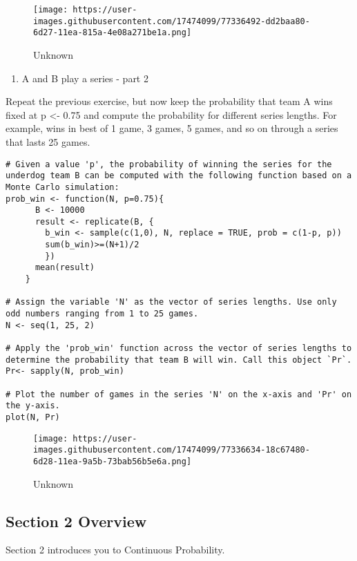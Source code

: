 \documentclass[
]{article}
\providecommand{\tightlist}{%
  \setlength{\itemsep}{0pt}\setlength{\parskip}{0pt}}
\begin{document}
\begin{figure}
\centering
\texttt{[image: https://user-images.githubusercontent.com/17474099/77336492-dd2baa80-6d27-11ea-815a-4e08a271be1a.png]}
\caption{Unknown}
\end{figure}

\begin{enumerate}
\def\labelenumi{\arabic{enumi}.}
\setcounter{enumi}{3}
\tightlist
\item
  A and B play a series - part 2
\end{enumerate}

Repeat the previous exercise, but now keep the probability that team A
wins fixed at p \textless- 0.75 and compute the probability for
different series lengths. For example, wins in best of 1 game, 3 games,
5 games, and so on through a series that lasts 25 games.

\begin{verbatim}
# Given a value 'p', the probability of winning the series for the underdog team B can be computed with the following function based on a Monte Carlo simulation:
prob_win <- function(N, p=0.75){
      B <- 10000
      result <- replicate(B, {
        b_win <- sample(c(1,0), N, replace = TRUE, prob = c(1-p, p))
        sum(b_win)>=(N+1)/2
        })
      mean(result)
    }

# Assign the variable 'N' as the vector of series lengths. Use only odd numbers ranging from 1 to 25 games.
N <- seq(1, 25, 2)

# Apply the 'prob_win' function across the vector of series lengths to determine the probability that team B will win. Call this object `Pr`.
Pr<- sapply(N, prob_win)

# Plot the number of games in the series 'N' on the x-axis and 'Pr' on the y-axis.
plot(N, Pr)
\end{verbatim}

\begin{figure}
\centering
\texttt{[image: https://user-images.githubusercontent.com/17474099/77336634-18c67480-6d28-11ea-9a5b-73bab56b5e6a.png]}
\caption{Unknown}
\end{figure}

\hypertarget{section-2-overview}{%
\subsection{Section 2 Overview}\label{section-2-overview}}

Section 2 introduces you to Continuous Probability.
\end{document}
